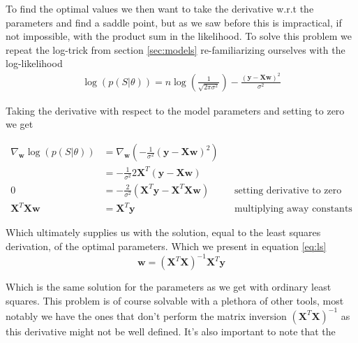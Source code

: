\noindent To find the optimal values we then want to take the derivative w.r.t the parameters and find a saddle point, but as we saw before this is impractical, if not impossible, with the product sum in the likelihood. To solve this problem we repeat the log-trick from section \ref{sec:models} re-familiarizing ourselves with the log-likelihood
\begin{align}
\log(p(S|\theta)) = n \log(\frac{1}{\sqrt{2\pi \sigma^2}}) - \frac{(\mathbf{y} - \mathbf{X}\mathbf{w})^2}{\sigma^2}
\end{align}

\noindent Taking the derivative with respect to the model parameters and setting to zero we get

\begin{align*}
\nabla_\mathbf{w} \log(p(S|\theta)) &=\nabla_\mathbf{w}\left( - \frac{1}{\sigma^2} (\mathbf{y} - \mathbf{X}\mathbf{w})^2 \right) \\
&= -\frac{1}{\sigma^2} 2 \mathbf{X}^T(\mathbf{y}- \mathbf{X}\mathbf{w}) \\
0 & = -\frac{2}{\sigma^2}(\mathbf{X}^T\mathbf{y} - \mathbf{X}^T\mathbf{Xw})&& \text{setting derivative to zero} \\
\mathbf{X}^T\mathbf{Xw} &= \mathbf{X}^T\mathbf{y}  && \text{multiplying away constants} 
\end{align*}

\noindent Which ultimately supplies us with the solution, equal to the least squares derivation, of the optimal parameters. Which we present in equation \ref{eq:ls}
\begin{equation}\label{eq:ls}
\mathbf{w}= (\mathbf{X}^T \mathbf{X})^{-1}\mathbf{X}^T\mathbf{y} 
\end{equation}


\noindent Which is the same solution for the parameters as we get with ordinary least squares. This problem is of course solvable with a plethora of other tools, most notably we have the ones that don't perform the matrix inversion $(\mathbf{X}^T \mathbf{X})^{-1}$ as this derivative might not be well defined. It's also important to note that the 